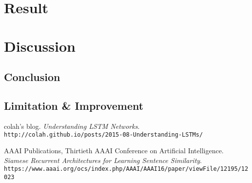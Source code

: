 \documentclass[11pt, oneside]{article}   	%
\begin{document}
\section{Result}
%


\section{Discussion}
\subsection{Conclusion}
 \subsection{Limitation \& Improvement}

\newpage

\medskip
 
\begin{thebibliography}{9}

colah's blog.
\textit{Understanding LSTM Networks}.
\\\texttt{http://colah.github.io/posts/2015-08-Understanding-LSTMs/}

AAAI Publications, Thirtieth AAAI Conference on Artificial Intelligence.
\textit{Siamese Recurrent Architectures for Learning Sentence Similarity}.
\\\texttt{https://www.aaai.org/ocs/index.php/AAAI/AAAI16/paper/viewFile/12195/12023}


\end{thebibliography}
\end{document}
